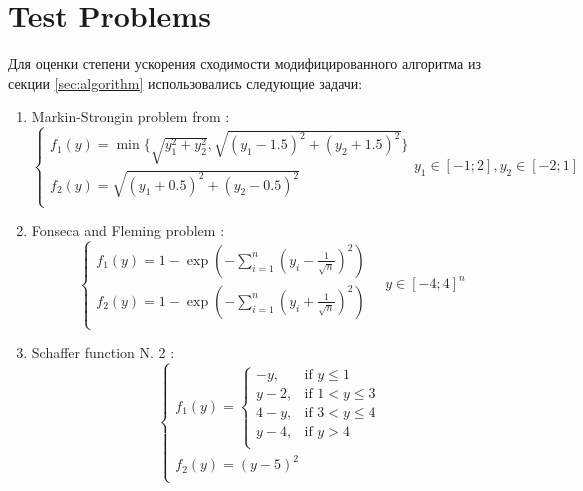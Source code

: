 \documentclass{llncs}
\begin{document}
\section{Test Problems}
\label{sec:test_problems}
Для оценки степени ускорения сходимости модифицированного алгоритма из секции \ref{sec:algorithm} использовались следующие задачи:
\begin{enumerate}
  \item Markin-Strongin problem from \cite{markinStrongin1993}:
    \begin{equation}
      \left \{
      \begin{array}{l}
        f_1(y) = \min\{\sqrt{y_1^2+y_2^2},\sqrt{(y_1-1.5)^2+(y_2+1.5)^2}\} \\
        f_2(y)=\sqrt{(y_1+0.5)^2+(y_2-0.5)^2} \\
      \end{array}
      \right .
      y_1\in [-1;2],y_2\in [-2;1]
    \end{equation}
  \item Fonseca and Fleming problem \cite{valedhuizenSuite}:
  \begin{equation}
    \label{eq:fonseca}
    \left \{
    \begin{array}{l}
      f_{1}\left(y\right) = 1 - \exp \left(-\sum_{i=1}^{n} \left(y_{i} - \frac{1}{\sqrt{n}} \right)^{2} \right) \\
      f_{2}\left(y\right) = 1 - \exp \left(-\sum_{i=1}^{n} \left(y_{i} + \frac{1}{\sqrt{n}} \right)^{2} \right) \\
    \end{array}
    \right .
    \quad y\in [-4;4]^n
  \end{equation}
  \item Schaffer function N. 2 \cite{valedhuizenSuite}:
    \begin{equation}
      \left \{
      \begin{array}{l}
        f_1(y) = \begin{cases}
                  -y,   & \text{if } y \leqslant 1 \\
                   y-2, & \text{if } 1 < y \leqslant 3 \\
                   4-y, & \text{if } 3 < y \leqslant 4 \\
                   y-4, & \text{if } y > 4 \\
                \end{cases} \\
        f_2(y) = (y-5)^2\\
      \end{array}

\end{equation}
\end{enumerate}
\end{document}
